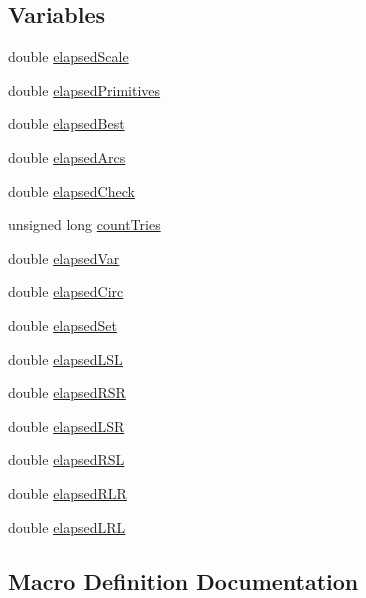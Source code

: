 \subsection*{Variables}
\begin{DoxyCompactItemize}
\item 
double \mbox{\hyperlink{dubins_8hh_a5880c4830bf2ab16bad216015448eacb}{elapsed\+Scale}}
\item 
double \mbox{\hyperlink{dubins_8hh_aa36733aa8c8ca5849070a465409dbe81}{elapsed\+Primitives}}
\item 
double \mbox{\hyperlink{dubins_8hh_a0031b22718178ccc76a4d8178e582b25}{elapsed\+Best}}
\item 
double \mbox{\hyperlink{dubins_8hh_a2ea7ce6fc7223d1e06dc71644336d66f}{elapsed\+Arcs}}
\item 
double \mbox{\hyperlink{dubins_8hh_a06fc38271c4ca7f7799fa903d94cae5a}{elapsed\+Check}}
\item 
unsigned long \mbox{\hyperlink{dubins_8hh_abcfdf634840cd6f14ae6d0762ecd1f95}{count\+Tries}}
\item 
double \mbox{\hyperlink{dubins_8hh_addc0762dc6f907d08093d87133317157}{elapsed\+Var}}
\item 
double \mbox{\hyperlink{dubins_8hh_ad0abfff7e943d5425fde32277365912b}{elapsed\+Circ}}
\item 
double \mbox{\hyperlink{dubins_8hh_abb6d93608c94bd3bd63217dc721ea2bf}{elapsed\+Set}}
\item 
double \mbox{\hyperlink{dubins_8hh_af7f52b98e604497e1df6126251edffcf}{elapsed\+L\+SL}}
\item 
double \mbox{\hyperlink{dubins_8hh_a5381897b84c903a717eda9680319f40a}{elapsed\+R\+SR}}
\item 
double \mbox{\hyperlink{dubins_8hh_ada1c98b34a456476f08c5cafbfe893ad}{elapsed\+L\+SR}}
\item 
double \mbox{\hyperlink{dubins_8hh_acb44475744bcbfbdf6609efd02c6c6fb}{elapsed\+R\+SL}}
\item 
double \mbox{\hyperlink{dubins_8hh_a3972b672793842e7de439255254d3085}{elapsed\+R\+LR}}
\item 
double \mbox{\hyperlink{dubins_8hh_a715f7de2f92786df84a14e5a013b94e9}{elapsed\+L\+RL}}
\end{DoxyCompactItemize}


\subsection{Macro Definition Documentation}
\mbox{\label{dubins_8hh_a3fd2b1bcd7ddcf506237987ad780f495}} 
